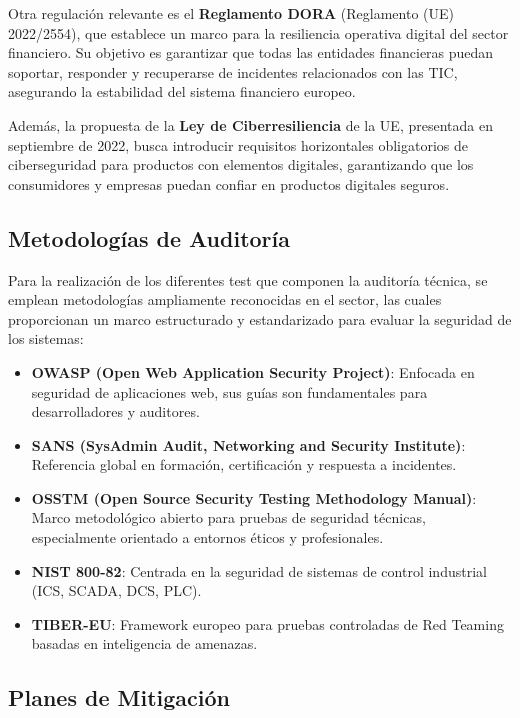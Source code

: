 \documentclass[a4paper, 10pt]{article}
\begin{document}
Otra regulación relevante es el \textbf{Reglamento DORA} (Reglamento (UE) 2022/2554), que establece un marco para la resiliencia operativa digital del sector financiero. Su objetivo es garantizar que todas las entidades financieras puedan soportar, responder y recuperarse de incidentes relacionados con las TIC, asegurando la estabilidad del sistema financiero europeo.\cite{bce}
\par\vspace{0.5cm}

Además, la propuesta de la \textbf{Ley de Ciberresiliencia} de la UE, presentada en septiembre de 2022, busca introducir requisitos horizontales obligatorios de ciberseguridad para productos con elementos digitales, garantizando que los consumidores y empresas puedan confiar en productos digitales seguros. \cite{comision_europea}



\subsection{Metodologías de Auditoría}

Para la realización de los diferentes test que componen la auditoría técnica, se emplean metodologías ampliamente reconocidas en el sector, las cuales proporcionan un marco estructurado y estandarizado para evaluar la seguridad de los sistemas:

\begin{itemize}
  \item \textbf{OWASP (Open Web Application Security Project)}: Enfocada en seguridad de aplicaciones web, sus guías son fundamentales para desarrolladores y auditores.
  \item \textbf{SANS (SysAdmin Audit, Networking and Security Institute)}: Referencia global en formación, certificación y respuesta a incidentes.
  \item \textbf{OSSTM (Open Source Security Testing Methodology Manual)}: Marco metodológico abierto para pruebas de seguridad técnicas, especialmente orientado a entornos éticos y profesionales.
  \item \textbf{NIST 800-82}: Centrada en la seguridad de sistemas de control industrial (ICS, SCADA, DCS, PLC).
  \item \textbf{TIBER-EU}: Framework europeo para pruebas controladas de Red Teaming basadas en inteligencia de amenazas.
\end{itemize}


    \subsection{Planes de Mitigación}
\end{document}
